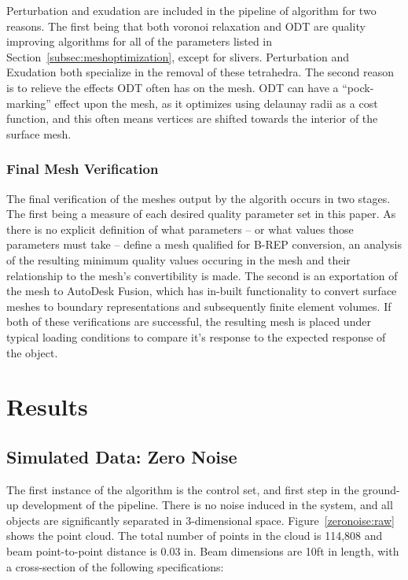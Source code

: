 \documentclass[12pt]{drexelthesis}
\let\Oldsection\section
\renewcommand{\section}{\FloatBarrier\Oldsection}
\let\Oldsubsection\subsection
\renewcommand{\subsection}{\FloatBarrier\Oldsubsection}
\begin{document}
Perturbation and exudation are included in the pipeline of algorithm for two reasons. The first being that both voronoi relaxation and ODT are quality improving algorithms for all of the parameters listed in Section~\ref{subsec:meshoptimization}, except for slivers. Perturbation and Exudation both specialize in the removal of these tetrahedra. The second reason is to relieve the effects ODT often has on the mesh. ODT can have a ``pock-marking'' effect upon the mesh, as it optimizes using delaunay radii as a cost function, and this often means vertices are shifted towards the interior of the surface mesh. 
 

\subsection{Final Mesh Verification}

The final verification of the meshes output by the algorith occurs in two stages. The first being a measure of each desired quality parameter set in this paper. As there is no explicit definition of what parameters -- or what values those parameters must take -- define a mesh qualified for B-REP conversion, an analysis of the resulting minimum quality values occuring in the mesh and their relationship to the mesh's convertibility is made. The second is an exportation of the mesh to AutoDesk Fusion, which has in-built functionality to convert surface meshes to boundary representations and subsequently finite element volumes. If both of these verifications are successful, the resulting mesh is placed under typical loading conditions to compare it's response to the expected response of the object.









\chapter{Results}
\label{chap:results}

\section{Simulated Data: Zero Noise}
The first instance of the algorithm is the control set, and first step in the ground-up development of the pipeline. There is no noise induced in the system, and all objects are significantly separated in 3-dimensional space. Figure~\ref{zeronoise:raw} shows the point cloud. The total number of points in the cloud is 114,808 and beam point-to-point distance is 0.03 in. Beam dimensions are 10ft in length, with a cross-section of the following specifications:
\end{document}
